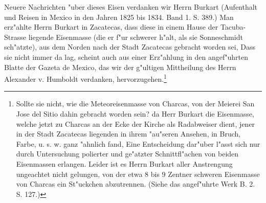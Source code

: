 \documentclass[a4paper, 11pt, oneside, polutonikogreek, german]{article}
\begin{document}
{\footnotesize Neuere Nachrichten "uber dieses Eisen verdanken wir Herrn Burkart (Aufenthalt und Reisen in Mexico in den Jahren 1825 bis 1834. Band 1. S. 389.) Man erz"ahlte Herrn Burkart in Zacatecas, dass diese in einem Hause der Tacuba-Strasse liegende Eisenmasse (die er f"ur schwerer h"alt, als sie Sonneschmidt sch"atzte), aus dem Norden nach der Stadt Zacatecas gebracht worden sei, Dass sie nicht immer da lag, scheint auch aus einer Erz"ahlung in den angef"uhrten Blatte der Gazeta de Mexico, das wir der g"ultigen Mittheilung des Herrn Alexander v. Humboldt verdanken, hervorzugehen.\footnote{ Sollte sie nicht, wie die Meteoreisenmasse von Charcas, von der Meierei San Jose del Sitio dahin gebracht worden sein? da Herr Burkart die Eisenmasse, welche jetzt zu Charcas an der Ecke der Kirche als Radabweiser dient, jener in der Stadt Zacatecas liegenden in ihrem "au"seren Ansehen, in Bruch, Farbe, u. s. w. ganz "ahnlich fand, Eine Entscheidung dar"uber l"asst sich nur durch Untersuchung polierter und ge"atzter Schnittfl"achen von beiden Eisenmassen erlangen. Leider ist es Herrn Burkart aller Anstrengung ungeachtet nicht gelungen, von der etwa 8 bis 9 Zentner schweren Eisenmasse von Charcas ein St"uckchen abzutrennen. (Siehe das angef"uhrte Werk B. 2. S. 127.)}}

\setlength{\leftskip}{0pt}
\setlength{\parindent}{20pt}
\end{document}
